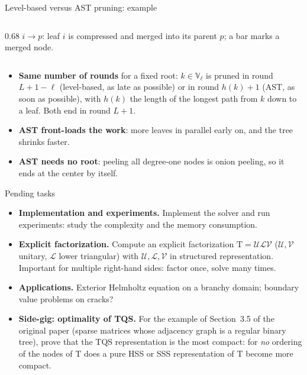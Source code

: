\documentclass[aspectratio=169,11pt]{beamer}
\begin{document}
\begin{frame}{Level-based versus AST pruning: example}
\begin{columns}[c]
\begin{column}{0.68\textwidth}
\vspace{1mm}
$i\to p$: leaf $i$ is compressed and merged into its parent $p$; a bar marks a merged node.
\end{column}
\end{columns}

\vspace{3mm}
\begin{itemize}
\item \textbf{Same number of rounds} for a fixed root: $k\in\mathbb{V}_\ell$ is pruned in round $L+1-\ell$ (level-based, as late as possible)
  or in round $h(k)+1$ (AST, as soon as possible), with $h(k)$ the length of the longest path from $k$ down to a leaf. Both end in round $L+1$.
\item \textbf{AST front-loads the work}: more leaves in parallel early on, and the tree shrinks faster.
\item \textbf{AST needs no root}: peeling all degree-one nodes is onion peeling, so it ends at the center by itself.
\end{itemize}
\end{frame}

\begin{frame}{Pending tasks}
\footnotesize
\begin{itemize}
\setlength{\itemsep}{3mm}
\item \textbf{Implementation and experiments.} Implement the solver and run experiments: study the
  complexity and the memory consumption.
\item \textbf{Explicit factorization.} Compute an explicit factorization
  $\mathrm{T}=\mathcal{U}\mathcal{L}\mathcal{V}$ ($\mathcal{U},\mathcal{V}$ unitary, $\mathcal{L}$ lower triangular)
  with $\mathcal{U},\mathcal{L},\mathcal{V}$ in structured representation. Important for multiple right-hand sides:
  factor once, solve many times.
\item \textbf{Applications.} Exterior Helmholtz equation on a branchy domain; boundary value problems on cracks?
\item \textbf{Side-gig: optimality of TQS.} For the example of Section~3.5 of the original paper
  (sparse matrices whose adjacency graph is a regular binary tree), prove that the TQS representation is the most compact:
  for \emph{no} ordering of the nodes of $\mathrm{T}$ does a pure HSS or SSS representation of $\mathrm{T}$ become more compact.
\end{itemize}
\end{frame}
\end{document}
